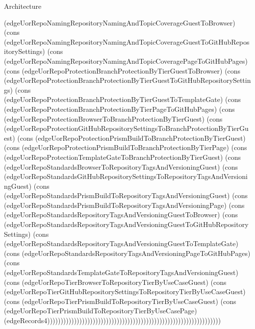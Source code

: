 \begin{lexlean}{Architecture}
\begin{semanticmodule}
{(edgeUorRepoNamingRepositoryNamingAndTopicCoverageGuestToBrowser) (cons (edgeUorRepoNamingRepositoryNamingAndTopicCoverageGuestToGitHubRepositorySettings) (cons (edgeUorRepoNamingRepositoryNamingAndTopicCoveragePageToGitHubPages) (cons (edgeUorRepoProtectionBranchProtectionByTierGuestToBrowser) (cons (edgeUorRepoProtectionBranchProtectionByTierGuestToGitHubRepositorySettings) (cons (edgeUorRepoProtectionBranchProtectionByTierGuestToTemplateGate) (cons (edgeUorRepoProtectionBranchProtectionByTierPageToGitHubPages) (cons (edgeUorRepoProtectionBrowserToBranchProtectionByTierGuest) (cons (edgeUorRepoProtectionGitHubRepositorySettingsToBranchProtectionByTierGuest) (cons (edgeUorRepoProtectionPrismBuildToBranchProtectionByTierGuest) (cons (edgeUorRepoProtectionPrismBuildToBranchProtectionByTierPage) (cons (edgeUorRepoProtectionTemplateGateToBranchProtectionByTierGuest) (cons (edgeUorRepoStandardsBrowserToRepositoryTagsAndVersioningGuest) (cons (edgeUorRepoStandardsGitHubRepositorySettingsToRepositoryTagsAndVersioningGuest) (cons (edgeUorRepoStandardsPrismBuildToRepositoryTagsAndVersioningGuest) (cons (edgeUorRepoStandardsPrismBuildToRepositoryTagsAndVersioningPage) (cons (edgeUorRepoStandardsRepositoryTagsAndVersioningGuestToBrowser) (cons (edgeUorRepoStandardsRepositoryTagsAndVersioningGuestToGitHubRepositorySettings) (cons (edgeUorRepoStandardsRepositoryTagsAndVersioningGuestToTemplateGate) (cons (edgeUorRepoStandardsRepositoryTagsAndVersioningPageToGitHubPages) (cons (edgeUorRepoStandardsTemplateGateToRepositoryTagsAndVersioningGuest) (cons (edgeUorRepoTierBrowserToRepositoryTierByUseCaseGuest) (cons (edgeUorRepoTierGitHubRepositorySettingsToRepositoryTierByUseCaseGuest) (cons (edgeUorRepoTierPrismBuildToRepositoryTierByUseCaseGuest) (cons (edgeUorRepoTierPrismBuildToRepositoryTierByUseCasePage) (edgeRecords4)))))))))))))))))))))))))))))))))))))))))))))))))))))))))))))))))
}


\end{semanticmodule}
\end{lexlean}
